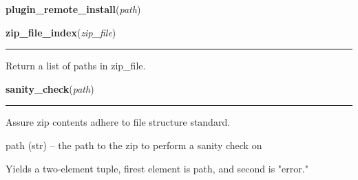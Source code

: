     \label{sakura:plugin_remote_install}

    \vspace{0.5ex}

\hspace{.8\funcindent}\begin{boxedminipage}{\funcwidth}

    \raggedright \textbf{plugin\_remote\_install}(\textit{path})

\setlength{\parskip}{2ex}
\setlength{\parskip}{1ex}
    \end{boxedminipage}

    \label{sakura:zip_file_index}

    \vspace{0.5ex}

\hspace{.8\funcindent}\begin{boxedminipage}{\funcwidth}

    \raggedright \textbf{zip\_file\_index}(\textit{zip\_file})

    \vspace{-1.5ex}

    \rule{\textwidth}{0.5\fboxrule}
\setlength{\parskip}{2ex}
    Return a list of paths in zip\_file.

\setlength{\parskip}{1ex}
    \end{boxedminipage}

    \label{sakura:sanity_check}

    \vspace{0.5ex}

\hspace{.8\funcindent}\begin{boxedminipage}{\funcwidth}

    \raggedright \textbf{sanity\_check}(\textit{path})

    \vspace{-1.5ex}

    \rule{\textwidth}{0.5\fboxrule}
\setlength{\parskip}{2ex}
    Assure zip contents adhere to file structure standard.

    path (str) -- the path to the zip to perform a sanity check on

    Yields a two-element tuple, firest element is path, and second is 
    "error."

\setlength{\parskip}{1ex}
    \end{boxedminipage}

